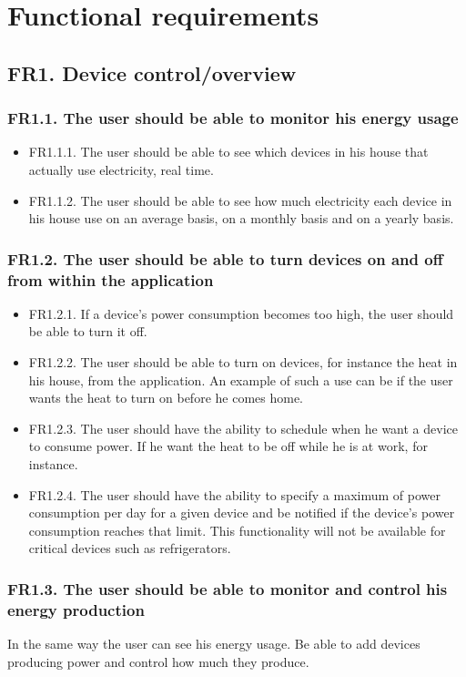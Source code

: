 \section{Functional requirements}
\subsection{FR1. Device control/overview}
\subsubsection{FR1.1. The user should be able to monitor his energy usage}

\begin{itemize}
\item FR1.1.1. The user should be able to see which devices in his house that actually use electricity, real time.
\item FR1.1.2. The user should be able to see how much electricity each device in his house use on an average basis, on a monthly basis and on a yearly basis.
\end{itemize}

\subsubsection{FR1.2. The user should be able to turn devices on and off from within the application}
\begin{itemize}
\item FR1.2.1. If a device's power consumption becomes too high, the user should be able to turn it off.
\item FR1.2.2. The user should be able to turn on devices, for instance the heat in his house, from the application. An example of such a use can be if the user wants the heat to turn on before he comes home.
\item FR1.2.3. The user should have the ability to schedule when he want a device to consume power. If he want the heat to be off while he is at work, for instance. 
\item FR1.2.4. The user should have the ability to specify a maximum of power 
consumption per day for a given device and be notified if the device's power
consumption reaches that limit. This functionality will not be available
for critical devices such as refrigerators. 
\end{itemize}

\subsubsection{FR1.3. The user should be able to monitor and control his energy production}
In the same way the user can see his energy usage. Be able to add devices producing power and control how much they produce.


